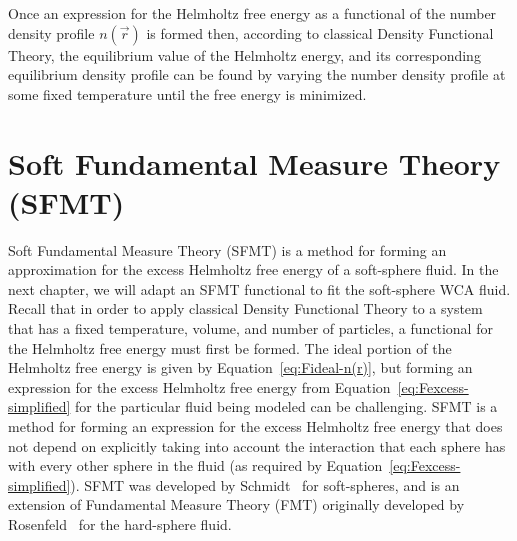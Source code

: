 \documentclass[double,12pt]{beavtex}
\begin{document}
Once an expression for the Helmholtz free energy as a functional of the
number density profile $n(\vec r)$ is formed then, according to classical 
Density Functional Theory, the equilibrium value of the 
Helmholtz energy, and its corresponding equilibrium density profile can be
found by varying the number density profile
at some fixed temperature until the free energy is minimized.  
 

\section{Soft Fundamental Measure Theory (SFMT)}
Soft Fundamental Measure Theory (SFMT) is a method for forming an 
approximation for the excess Helmholtz free energy of a soft-sphere fluid.
In the next chapter, 
we will adapt an SFMT functional to fit the soft-sphere WCA fluid.
Recall that in order to apply classical Density Functional Theory 
to a system that has a fixed temperature, volume, and number of particles, 
a functional for the Helmholtz free energy must first be formed. 
The ideal portion of the Helmholtz free energy is given by 
Equation~\ref{eq:Fideal-n(r)}, but forming an expression for the excess 
Helmholtz free energy from Equation~\ref{eq:Fexcess-simplified} for the 
particular fluid being modeled can be challenging. 
SFMT is a method for forming an 
expression for the excess Helmholtz free energy
that does not depend on explicitly taking into account the interaction 
that each sphere has with every other sphere in the fluid (as required by 
Equation~\ref{eq:Fexcess-simplified}).
SFMT was developed by Schmidt~\cite{schmidt1999density, schmidt2000fluid} 
for soft-spheres, and is an extension of Fundamental Measure Theory (FMT) 
originally developed by 
Rosenfeld~\cite{rosenfeld1989, rosenfeld1994, rosenfeld1996, fmtfromsptandsignerror} 
for the hard-sphere fluid. 
\end{document}
